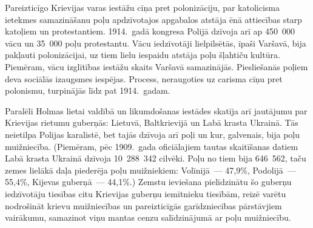 \documentclass[twoside,a5paper,12pt,fleqn,openany]{extbook}
\begin{document}
Pareizticīgo Krievijas varas iestāžu cīņa pret polonizāciju, par katolicisma ietekmes samazināšanu poļu apdzīvotajos apgabalos atstāja ēnā attiecības starp katoļiem un protestantiem. 1914.~gadā kongresa Polijā dzīvoja arī ap 450~000 vācu un 35~000 poļu protestantu. Vācu iedzīvotāji lielpilsētās, īpaši Varšavā, bija pakļauti polonizācijai, uz tiem lielu iespaidu atstāja poļu šļahtiču kultūra. Piemēram, vācu izglītības iestāžu skaits Varšavā samazinājās. Piesliešanās poļiem deva sociālās izaugsmes iespējas. Process, neraugoties uz carisma cīņu pret polonismu, turpinājās līdz pat 1914.~gadam.

Paralēli Holmas lietai valdībā un likumdošanas iestādes skatīja arī jautājumu par  Krievijas rietumu guberņās: Lietuvā, Baltkrievijā un Labā krasta Ukrainā. Tās neietilpa Polijas karalistē, bet tajās dzīvoja arī poļi un kur, galvenais, bija poļu muižniecība. (Piemēram, pēc 1909.~gada oficiālajiem tautas skaitīšanas datiem Labā krasta Ukrainā dzīvoja 10~288~342 cilvēki. Poļu no tiem bija 646~562, taču zemes lielākā daļa piederēja poļu muižniekiem: Volīnijā~--- 47,9\%, Podolijā~--- 55,4\%, Kijevas guberņā~--- 44,1\%.) Zemstu ieviešana pielīdzinātu šo guberņu iedzīvotāju tiesības citu Krievijas guberņu iemītnieku tiesībām, reizē varētu nodrošināt krievu muižniecības un pareizticīgās garīdzniecības pārstāvjiem vairākumu, samazinot viņu mantas cenzu salīdzinājumā ar poļu muižniecību.
\end{document}
